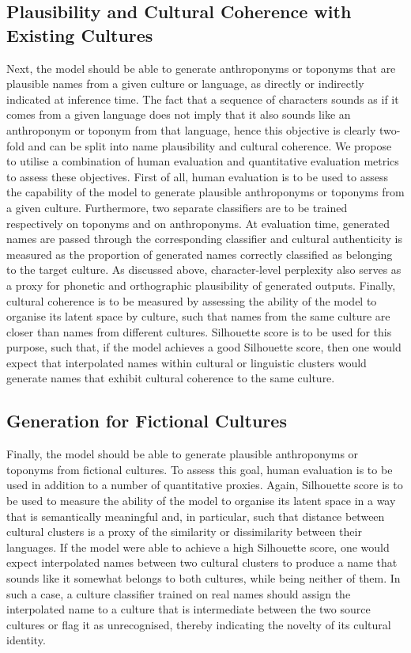 \documentclass[Main.tex]{subfiles}
\begin{document}
\subsection{Plausibility and Cultural Coherence with Existing Cultures}
Next, the model should be able to generate anthroponyms or toponyms that are plausible names from a given culture or language, as directly or indirectly indicated at inference time. The fact that a sequence of characters sounds as if it comes from a given language does not imply that it also sounds like an anthroponym or toponym from that language, hence this objective is clearly two-fold and can be split into name plausibility and cultural coherence. We propose to utilise a combination of human evaluation and quantitative evaluation metrics to assess these objectives. First of all, human evaluation is to be used to assess the capability of the model to generate plausible anthroponyms or toponyms from a given culture. Furthermore, two separate classifiers are to be trained respectively on toponyms and on anthroponyms. At evaluation time, generated names are passed through the corresponding classifier and cultural authenticity is measured as the proportion of generated names correctly classified as belonging to the target culture. As discussed above, character-level perplexity also serves as a proxy for phonetic and orthographic plausibility of generated outputs. Finally, cultural coherence is to be measured by assessing the ability of the model to organise its latent space by culture, such that names from the same culture are closer than names from different cultures. Silhouette score \cite{rousseeuw_silhouettes_1987} is to be used for this purpose, such that, if the model achieves a good Silhouette score, then one would expect that interpolated names within cultural or linguistic clusters would generate names that exhibit cultural coherence to the same culture.\\

\subsection{Generation for Fictional Cultures}
Finally, the model should be able to generate plausible anthroponyms or toponyms from fictional cultures. To assess this goal, human evaluation is to be used in addition to a number of quantitative proxies. Again, Silhouette score is to be used to measure the ability of the model to organise its latent space in a way that is semantically meaningful and, in particular, such that distance between cultural clusters is a proxy of the similarity or dissimilarity between their languages.  If the model were able to achieve a high Silhouette score, one would expect interpolated names between two cultural clusters to produce a name that sounds like it somewhat belongs to both cultures, while being neither of them. In such a case, a culture classifier trained on real names should assign the interpolated name to a culture that is intermediate between the two source cultures or flag it as unrecognised, thereby indicating the novelty of its cultural identity.\\
\end{document}
